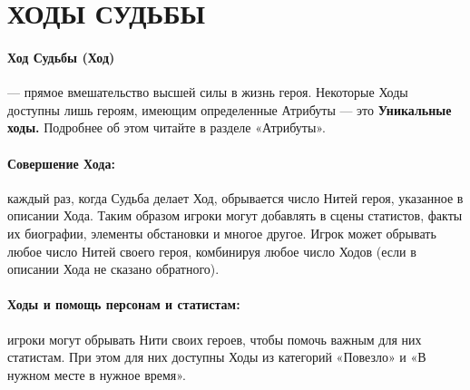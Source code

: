 \section{ХОДЫ СУДЬБЫ}
\paragraph{Ход Судьбы (Ход)} — прямое вмешательство высшей силы в жизнь героя. Некоторые Ходы доступны лишь героям, имеющим определенные Атрибуты — это \textbf{Уникальные ходы.} Подробнее об этом читайте в разделе «Атрибуты».
\paragraph{Совершение Хода:} каждый раз, когда Судьба делает Ход, обрывается число Нитей героя, указанное в описании Хода. Таким образом игроки могут добавлять в сцены статистов, факты их биографии, элементы обстановки и многое другое. Игрок может обрывать любое число Нитей своего героя, комбинируя любое число Ходов (если в описании Хода не сказано обратного).
\paragraph{Ходы и помощь персонам и статистам:} игроки могут обрывать Нити своих героев, чтобы помочь важным для них статистам. При этом для них доступны Ходы из категорий «Повезло» и «В нужном месте в нужное время».